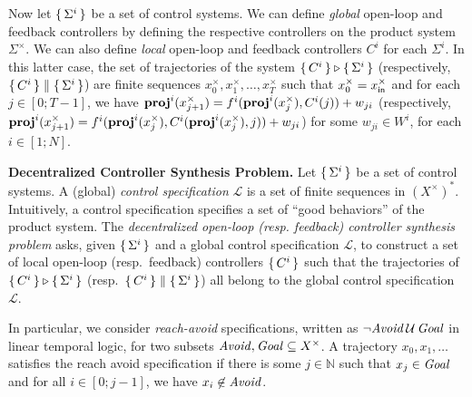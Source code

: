 Now let $\set{\Sigma^i}$ be a set of control systems.
We can define \emph{global} open-loop and feedback controllers by defining the respective controllers on the product system $\Sigma^\times$.
We can also define \emph{local} open-loop and feedback controllers $C^i$ for each $\Sigma^i$.
In this latter case, the set of trajectories of the system $\set{C^i} \triangleright \set{\Sigma^i}$ (respectively, $\set{C^i}\parallel \set{\Sigma^i}$)
are finite sequences 
$x_0^\times, x_1^\times, \ldots, x_T^\times$ such that
$x_0^\times = x_{\mathsf{in}}^\times$ and for each $j \in [0;T-1]$, we have 
$\mathbf{proj}^{i}(x_{j+1}^\times) = f^i(\mathbf{proj}^i(x_j^\times), C^i(j))+w_{ji}$
(respectively, 
$\mathbf{proj}^{i}(x_{j+1}^\times) = f^i(\mathbf{proj}^i(x_j^\times), C^i(\mathbf{proj}^i(x_j^\times), j))+w_{ji}$)
for some $w_{ji} \in W^i$, for each $i\in [1;N]$.

\smallskip
\noindent
\textbf{Decentralized Controller Synthesis Problem.}
Let $\set{\Sigma^i}$ be a set of control systems.
A (global) \emph{control specification} $\mathcal{L}$ is a set of finite sequences in $(X^\times)^*$.
Intuitively, a control specification specifies a set of ``good behaviors'' of the product system.
The \emph{decentralized open-loop (resp. feedback) controller synthesis problem} asks, given $\set{\Sigma^i}$ and a global control specification $\mathcal{L}$,
to construct a set of local open-loop (resp.\ feedback) controllers $\set{C^i}$ such that
the trajectories of $\set{C^i}\triangleright \set{\Sigma^i}$ (resp.\ $\set{C^i}\parallel \set{\Sigma^i}$) all belong to the global
control specification $\mathcal{L}$.

In particular, we consider \emph{reach-avoid} specifications, written as  $\lnot\mathit{Avoid}\, \mathcal{U}\,\mathit{Goal}$ in linear temporal logic, for two subsets 
$\mathit{Avoid}, \mathit{Goal} \subseteq X^\times$.
A trajectory $x_0, x_1, \ldots$ satisfies the reach avoid specification if there is some $j\in \mathbb{N}$ such that $x_j \in\mathit{Goal}$ and
for all $i \in [0; j-1]$, we have $x_i \not \in\mathit{Avoid}$.

